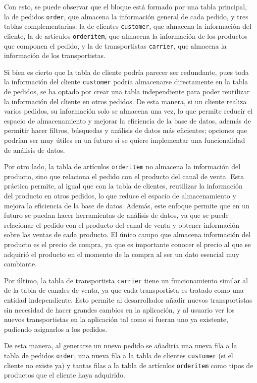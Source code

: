 Con esto, se puede observar que el bloque está formado por una tabla principal, la de pedidos \texttt{order}, que almacena la información general de cada pedido, y tres tablas complementarias: la de clientes \texttt{customer}, que almacena la información del cliente, la de artículos \texttt{orderitem}, que almacena la información de los productos que componen el pedido, y la de transportistas \texttt{carrier}, que almacena la información de los transportistas.

Si bien es cierto que la tabla de cliente podría parecer ser redundante, pues toda la información del cliente \texttt{customer} podría almacenarse directamente en la tabla de pedidos, se ha optado por crear una tabla independiente para poder reutilizar la información del cliente en otros pedidos. De esta manera, si un cliente realiza varios pedidos, su información solo se almacena una vez, lo que permite reducir el espacio de almacenamiento y mejorar la eficiencia de la base de datos, además de permitir hacer filtros, búsquedas y análisis de datos más eficientes; opciones que podrían ser muy útiles en un futuro si se quiere implementar una funcionalidad de análisis de datos.

Por otro lado, la tabla de artículos \texttt{orderitem} no almacena la información del producto, sino que relaciona el pedido con el producto del canal de venta. Esta práctica permite, al igual que con la tabla de clientes, reutilizar la información del producto en otros pedidos, lo que reduce el espacio de almacenamiento y mejora la eficiencia de la base de datos. Además, este enfoque permite que en un futuro se puedan hacer herramientas de análisis de datos, ya que se puede relacionar el pedido con el producto del canal de venta y obtener información sobre las ventas de cada producto. El único campo que almacena información del producto es el precio de compra, ya que es importante conocer el precio al que se adquirió el producto en el momento de la compra al ser un dato esencial muy cambiante.

Por último, la tabla de transportista \texttt{carrier} tiene un funcionamiento similar al de la tabla de canales de venta, ya que cada transportista es tratado como una entidad independiente. Esto permite al desarrollador añadir nuevos transportistas sin necesidad de hacer grandes cambios en la aplicación, y al usuario ver los nuevos transportistas en la aplicación tal como si fueran uno ya existente, pudiendo asignarlos a los pedidos.

De esta manera, al generarse un nuevo pedido se añadiría una nueva fila a la tabla de pedidos \texttt{order}, una nueva fila a la tabla de clientes \texttt{customer} (si el cliente no existe ya) y tantas filas a la tabla de artículos \texttt{orderitem} como tipos de productos que el cliente haya adquirido.

